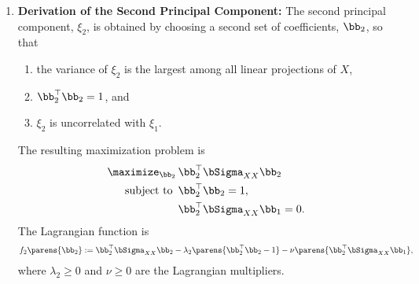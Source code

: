 \documentclass[12pt]{article}
\begin{document}
\begin{enumerate}[label=\textbf{\arabic*.}]
	\item \textbf{Derivation of the Second Principal Component:} The second principal component, $\xi_2$, is obtained by choosing a second set of coefficients, $\bb_2$, so that 
	\begin{enumerate}
		\item the variance of $\xi_2$ is the largest among all linear projections of $X$, 
		\item $\bb_2^\top \bb_2 = 1$, and 
		\item $\xi_2$ is uncorrelated with $\xi_1$. 
	\end{enumerate}
	The resulting maximization problem is 
	\begin{equation*}
		\begin{aligned}
			\maximize_{\bb_2} & \, \bb_2^\top \bSigma_{XX} \bb_2 \\ 
			\text{ subject to } & \, \bb_2^\top \bb_2 = 1, \\ 
			& \, \bb_2^\top \bSigma_{XX} \bb_1 = 0. 
		\end{aligned}
	\end{equation*}
	The Lagrangian function is 
	\begin{align*}
		f_2 \parens{\bb_2} := \bb_2^\top \bSigma_{XX} \bb_2 - \lambda_2 \parens{\bb_2^\top \bb_2 - 1} - \nu \parens{\bb_2^\top \bSigma_{XX} \bb_1}, 
	\end{align*}
	where $\lambda_2 \ge 0$ and $\nu \ge 0$ are the Lagrangian multipliers. 
	

\end{enumerate}
\end{document}
